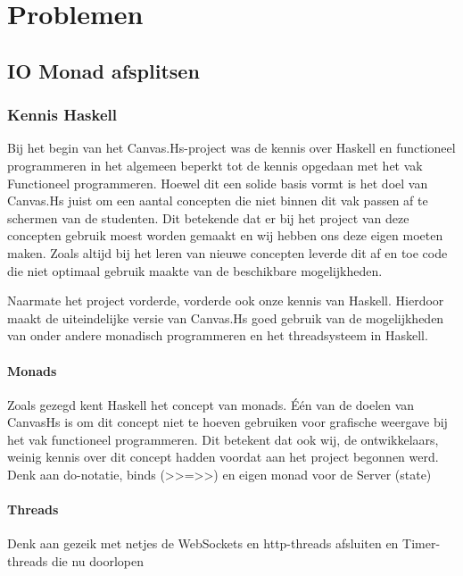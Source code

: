 \section{Problemen}
\subsection{IO Monad afsplitsen}


\subsubsection{Kennis Haskell}
Bij het begin van het Canvas.Hs-project was de kennis over Haskell en functioneel programmeren in het algemeen beperkt tot de kennis opgedaan met het vak Functioneel programmeren. Hoewel dit een solide basis vormt is het doel van Canvas.Hs juist om een aantal concepten die niet binnen dit vak passen af te schermen van de studenten. Dit betekende dat er bij het project van deze concepten gebruik moest worden gemaakt en wij hebben ons deze eigen moeten maken. Zoals altijd bij het leren van nieuwe concepten leverde dit af en toe code die niet optimaal gebruik maakte van de beschikbare mogelijkheden.

Naarmate het project vorderde, vorderde ook onze kennis van Haskell. Hierdoor maakt de uiteindelijke versie van Canvas.Hs goed gebruik van de mogelijkheden van onder andere monadisch programmeren en het threadsysteem in Haskell.

\paragraph{Monads}
Zoals gezegd kent Haskell het concept van monads. Één van de doelen van CanvasHs is om dit concept niet te hoeven gebruiken voor grafische weergave bij het vak functioneel programmeren. Dit betekent dat ook wij, de ontwikkelaars, weinig kennis over dit concept hadden voordat aan het project begonnen werd.
Denk aan do-notatie, binds (>>=>>) en eigen monad voor de Server (state)

\paragraph{Threads}
Denk aan gezeik met netjes de WebSockets en http-threads afsluiten en Timer-threads die nu doorlopen 


